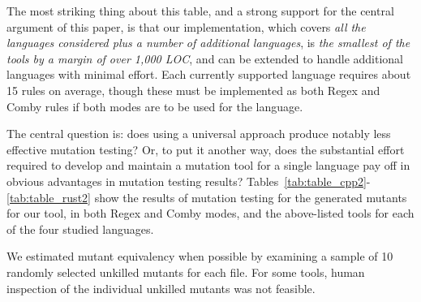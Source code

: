 \documentclass[sigconf,review, anonymous]{acmart}
\begin{document}
{The most striking thing about this table, and a strong support for
the central argument of this paper, is that our implementation, which
covers \emph{all the languages considered plus a number of additional
languages}, is \emph{the smallest of the tools by a margin of over 1,000 LOC},
and can be extended to handle additional languages with minimal
effort.  Each currently supported language requires about 15 rules on
average, though these must be implemented as both Regex and Comby
rules if both modes are to be used for the language.

The central question is: does using a universal approach produce
notably less effective mutation testing?  Or, to put it another way,
does the substantial effort required to develop and maintain a
mutation tool for a single language pay off in obvious advantages in
mutation testing results?
Tables~\ref{tab:table_cpp2}-\ref{tab:table_rust2} show the results of
mutation testing for the generated mutants for our tool, in both Regex
and Comby modes, and the above-listed tools for each of the four
studied languages.

We estimated mutant equivalency when possible by examining a sample of
10 randomly selected unkilled mutants for each file.  For some tools,
human inspection of the individual unkilled mutants was not feasible.


\begin{table}[htbp]
\centering
\caption{C++ (Our Implementation vs. Dextool)}
\label{tab:table_cpp2}
\end{table}}
\end{document}
